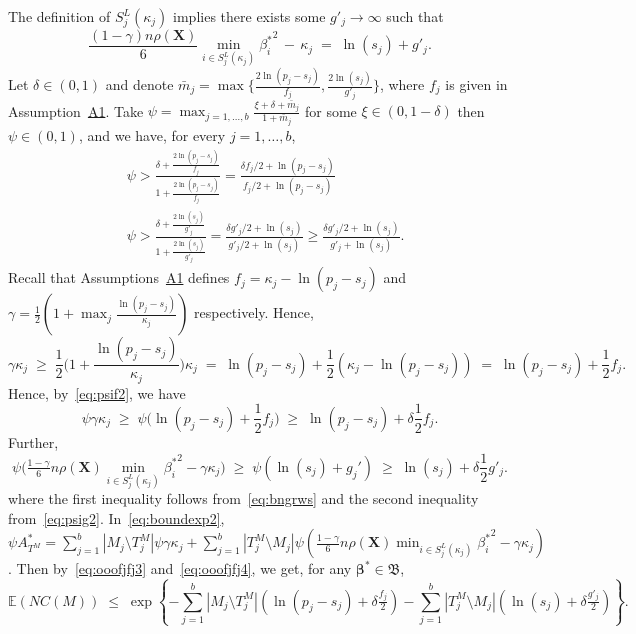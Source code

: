 \documentclass[
  12pt]{article}
\newcommand{\E}{\mathbb{E}}
\newcommand{\bbeta}{\boldsymbol{\beta}}
\newcommand{\bX}{\mathbf{X}}
\newcommand{\bB}{\mathfrak{B}}
\begin{document}
The definition of $S_j^{L}(\kappa_j)$ implies there exists some $g'_j \to \infty$ such that
\begin{equation}\label{eq:bngrws}
  \frac{(1-\gamma) n\rho(\bX)}{6}\min_{i\in S_j^{L}(\kappa_j)}{\beta^*_i}^{2}\,- \,\kappa_j \;=\; \ln(s_j) + g'_{j}.  
\end{equation}
Let $\delta \in (0,1)$ and denote $\bar{m}_j=\max\big\{\frac{2\ln(p_j-s_j)}{f_j},\frac{2\ln(s_j)}{g'_{j}}\big\}$, where $f_j$ is given in Assumption~\hyperlink{lab:A1}{A1}. 
Take $\psi=\max_{j=1,\ldots,b}\frac{\xi + \delta + \bar{m}_j}{1+\bar{m}_j}$ for some $\xi \in(0, 1- \delta)$ then $\psi \in (0,1)$, and we have, for every $j=1,\ldots,b$,
\begin{align}
    &\psi > \frac{\delta + \frac{2\ln(p_j-s_j)}{f_j}}{1+\frac{2\ln(p_j-s_j)}{f_j}} = \frac{\delta f_j/2 + \ln(p_j-s_j)}{f_j/2 +\ln(p_j-s_j)} \label{eq:psif2}\\
    &\psi > \frac{\delta + \frac{2\ln(s_j)}{g'_j}}{1+\frac{2\ln(s_j)}{g'_j}} = \frac{\delta g'_j/2 + \ln(s_j)}{g'_j/2 +\ln(s_j)} \geq \frac{\delta g'_j/2 + \ln(s_j)}{g'_j +\ln(s_j)}.\label{eq:psig2}
\end{align}
 Recall that Assumptions~\hyperlink{lab:A1}{A1} defines $f_j= \kappa_j - \ln(p_j-s_j)$ and $\gamma= \frac{1}{2}(1 + \max_j \frac{\ln(p_j-s_j)}{\kappa_j})$ respectively. Hence,
$$
\gamma\kappa_j\;\geq\;\frac12 \Big(1+\frac{\ln(p_j-s_j)}{\kappa_j}\Big)\kappa_j\;=\;\ln(p_j-s_j)+\frac12(\kappa_j-\ln(p_j-s_j)) \;=\; \ln(p_j-s_j)+ \frac12f_j.
$$
Hence, by~\eqref{eq:psif2}, we have
\begin{equation}\label{eq:ooofjfj3}
\psi\gamma\kappa_j \;\geq\; \psi\big(\ln(p_j-s_j)+ \frac12f_j\big) \;\geq\;  \ln(p_j-s_j)+ \delta\frac12f_j.
\end{equation}
Further,
\begin{equation}\label{eq:ooofjfj4}
\psi\bigg(\tfrac{1-\gamma}{6} n \rho(\bX) \min_{i\in S_j^{L}(\kappa_j)}{\beta^*_i}^{2} - \gamma\kappa_j\bigg) \;\geq\; \psi\left(\ln(s_j)+g_j'\right) \;\geq\; \ln(s_j)+\delta \frac{1}{2}g'_j.
\end{equation}
where the first inequality follows from~\eqref{eq:bngrws} and the second inequality from~\eqref{eq:psig2}. In~\eqref{eq:boundexp2}, $\psi A^*_{T^M}=\sum_{j=1}^b|M_j \setminus T^M_j|\psi\gamma\kappa_j + \sum_{j=1}^b |T^M_j \setminus M_j|\psi\left(\tfrac{1-\gamma}{6} n \rho(\bX) \min_{i\in S_j^{L}(\kappa_j)}{\beta^*_i}^{2} - \gamma\kappa_j\right)$. Then by~\eqref{eq:ooofjfj3} and~\eqref{eq:ooofjfj4}, we get, for any $\bbeta^*\in\bB$, 
\begin{equation}\label{eq:fyv2}
\E(NC(M))\;\leq\;\exp\left\{- \sum_{j=1}^b |M_j\setminus T^M_j|(\ln(p_j-s_j)+\delta \tfrac{f_j}{2})-\sum_{j=1}^b |T^M_j\setminus M_j|(\ln(s_j)+\delta \tfrac{g'_j}{2})\right\}.
\end{equation}
\end{document}
